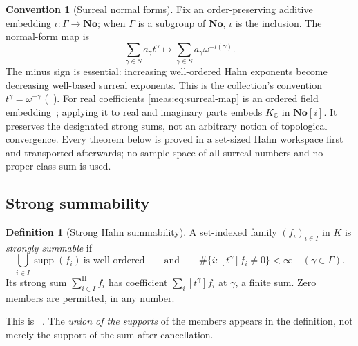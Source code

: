 \documentclass[11pt]{article}
\numberwithin{equation}{section}
\theoremstyle{definition}
\newtheorem{definition}[theorem]{Definition}
\newtheorem{convention}[theorem]{Convention}
\theoremstyle{remark}
\newcommand{\C}{\mathbb C}
\newcommand{\No}{\mathbf{No}}
\newcommand{\KC}{K_{\C}}
\newcommand{\supp}{\operatorname{supp}}
\newcommand{\coef}[2]{[t^{#1}]#2}
\newcommand{\hsum}{\mathop{\sum}\nolimits^{\mathrm H}}
\begin{document}
\begin{convention}[Surreal normal forms]\label{meas:conv:surreal}
Fix an order-preserving additive embedding $\iota:\Gamma\to\No$; when $\Gamma$
is a subgroup of $\No$, $\iota$ is the inclusion. The normal-form map is
\begin{equation}\label{meas:eq:surreal-map}
 \sum_{\gamma\in S}a_\gamma t^\gamma\longmapsto
 \sum_{\gamma\in S}a_\gamma\omega^{-\iota(\gamma)}.
\end{equation}
The minus sign is essential: increasing well-ordered Hahn exponents become
decreasing well-based surreal exponents. This is the collection's convention
$t^\gamma=\omega^{-\gamma}$ (~\cite{repofound}).
For real coefficients \eqref{meas:eq:surreal-map} is an ordered field
embedding~\cite{Gonshor,BG}; applying it to real and imaginary parts embeds
$\KC$ in $\No[i]$. It preserves the designated strong sums, not an arbitrary
notion of topological convergence. Every theorem below is proved in a
set-sized Hahn workspace first and transported afterwards; no sample space of
all surreal numbers and no proper-class sum is used.
\end{convention}

\subsection{Strong summability}\label{meas:sub:summability}

\begin{definition}[Strong Hahn summability]\label{meas:def:summability}
A set-indexed family $(f_i)_{i\in I}$ in $K$ is \emph{strongly summable} if
\[
 \bigcup_{i\in I}\supp(f_i)\ \text{is well ordered}
 \qquad\text{and}\qquad
 \#\{i:\coef{\gamma}{f_i}\ne0\}<\infty\quad(\gamma\in\Gamma).
\]
Its strong sum $\hsum_{i\in I}f_i$ has coefficient $\sum_i\coef{\gamma}{f_i}$ at
$\gamma$, a finite sum. Zero members are permitted, in any number.
\end{definition}

This is ~\cite{repofound}. The \emph{union of the
supports} of the members appears in the definition, not merely the support of
the sum after cancellation.
\end{document}
